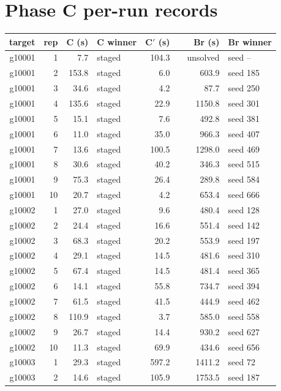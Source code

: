 \documentclass[11pt,a4paper]{article}
\begin{document}
\section{Phase C per-run records}
{\small\begin{longtable}{@{}rrrlrlrl@{}}\toprule target & rep & C (s) & C winner & C$'$ (s) & & Br (s) & Br winner\\\midrule\endhead
g10001 & 1 & 7.7 & staged & 104.3 & & unsolved & seed --\\
g10001 & 2 & 153.8 & staged & 6.0 & & 603.9 & seed 185\\
g10001 & 3 & 34.6 & staged & 4.2 & & 87.7 & seed 250\\
g10001 & 4 & 135.6 & staged & 22.9 & & 1150.8 & seed 301\\
g10001 & 5 & 15.1 & staged & 7.6 & & 492.8 & seed 381\\
g10001 & 6 & 11.0 & staged & 35.0 & & 966.3 & seed 407\\
g10001 & 7 & 13.6 & staged & 100.5 & & 1298.0 & seed 469\\
g10001 & 8 & 30.6 & staged & 40.2 & & 346.3 & seed 515\\
g10001 & 9 & 75.3 & staged & 26.4 & & 289.8 & seed 584\\
g10001 & 10 & 20.7 & staged & 4.2 & & 653.4 & seed 666\\
g10002 & 1 & 27.0 & staged & 9.6 & & 480.4 & seed 128\\
g10002 & 2 & 24.4 & staged & 16.6 & & 551.4 & seed 142\\
g10002 & 3 & 68.3 & staged & 20.2 & & 553.9 & seed 197\\
g10002 & 4 & 29.1 & staged & 14.5 & & 481.6 & seed 310\\
g10002 & 5 & 67.4 & staged & 14.5 & & 481.4 & seed 365\\
g10002 & 6 & 14.1 & staged & 55.8 & & 734.7 & seed 394\\
g10002 & 7 & 61.5 & staged & 41.5 & & 444.9 & seed 462\\
g10002 & 8 & 110.9 & staged & 3.7 & & 585.0 & seed 558\\
g10002 & 9 & 26.7 & staged & 14.4 & & 930.2 & seed 627\\
g10002 & 10 & 11.3 & staged & 69.9 & & 434.6 & seed 656\\
g10003 & 1 & 29.3 & staged & 597.2 & & 1411.2 & seed 72\\
g10003 & 2 & 14.6 & staged & 105.9 & & 1753.5 & seed 187\\

\end{longtable}}
\end{document}
